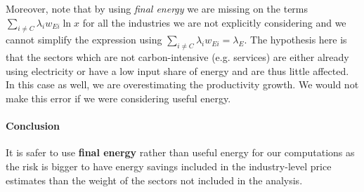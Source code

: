 Moreover, note that by using \textit{final energy}  we are missing on the terms $\sum_{i\neq C}\lambda_i w_{Ei}\ln{x}$ for all the industries we are not explicitly considering and we cannot simplify the expression using $\sum_{i\neq C}\lambda_i w_{Ei}=\lambda_E$. The hypothesis here is that the sectors which are not carbon-intensive (e.g. services) are either already using electricity or have a low input share of energy and are thus little affected. In this case as well, we are overestimating the productivity growth. We would not make this error if we were considering useful energy.

\paragraph{Conclusion} It is safer to use \textbf{final energy} rather than useful energy for our computations as the risk is bigger to have energy savings included in the industry-level price estimates than the weight of the sectors not included in the analysis.

